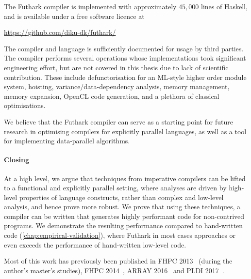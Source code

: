 The Futhark compiler is implemented with approximately $45,000$ lines
of Haskell, and is available under a free software licence at

\centerline{\url{https://github.com/diku-dk/futhark/}}

The compiler and language is sufficiently documented for usage by
third parties.  The compiler performs several operations whose
implementations took significant engineering effort, but are not
covered in this thesis due to lack of scientific contribution.  These
include defunctorisation for an ML-style higher order module system,
hoisting, variance/data-dependency analysis, memory management, memory
expansion, OpenCL code generation, and a plethora of classical
optimisations.

We believe that the Futhark compiler can serve as a starting point for
future research in optimising compilers for explicitly parallel
languages, as well as a tool for implementing data-parallel
algorithms.

\paragraph{Closing}

At a high level, we argue that techniques from imperative compilers
can be lifted to a functional and explicitly parallel setting, where
analyses are driven by high-level properties of language constructs,
rather than complex and low-level analysis, and hence prove more
robust.  We prove that using these techniques, a compiler can be
written that generates highly performant code for non-contrived
programs.  We demonstrate the resulting performance compared to
hand-written code (\cref{chap:empirical-validation}), where Futhark in
most cases approaches or even exceeds the performance of hand-written
low-level code.

Most of this work has previously been published in FHPC
2013~\cite{henriksen2013t2} (during the author's master's studies),
FHPC 2014~\cite{henriksen2014size}, ARRAY 2016~\cite{Futhark:redomap,}
and PLDI 2017~\cite{henriksen2017futhark}.

